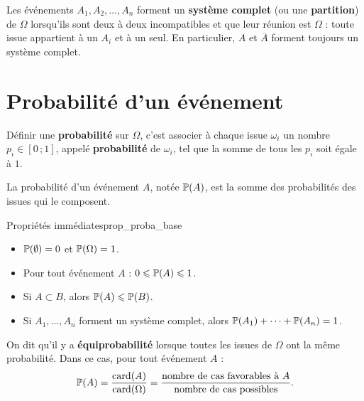 \begin{definition}
	Les événements $A_1,A_2,\ldots,A_n$ forment un \textbf{système complet}
	(ou une \textbf{partition}) de $\Omega$ lorsqu'ils sont deux à deux
	incompatibles et que leur réunion est $\Omega$ : toute issue appartient à
	un $A_i$ et à un seul. En particulier, $A$ et $\overline{A}$ forment
	toujours un système complet.
\end{definition}


\section{Probabilité d'un événement}

\begin{definition}[Probabilité]
	Définir une \textbf{probabilité} sur $\Omega$, c'est associer à chaque
	issue $\omega_i$ un nombre $p_i \in [0\,;1]$, appelé \textbf{probabilité}
	de $\omega_i$, tel que la somme de tous les $p_i$ soit égale à $1$.

	La probabilité d'un événement $A$, notée $\mathbb{P}(A)$, est la somme des
	probabilités des issues qui le composent.
\end{definition}

\begin{propriete}{Propriétés immédiates}{prop_proba_base}
	\begin{itemize}[label=\textbullet]
		\item $\mathbb{P}(\emptyset) = 0$ et $\mathbb{P}(\Omega) = 1$.
		\item Pour tout événement $A$ : $0 \leqslant \mathbb{P}(A) \leqslant 1$.
		\item Si $A\subset B$, alors $\mathbb{P}(A)\leqslant\mathbb{P}(B)$.
		\item Si $A_1,\ldots,A_n$ forment un système complet, alors
		$\mathbb{P}(A_1)+\cdots+\mathbb{P}(A_n)=1$.
	\end{itemize}
\end{propriete}

\begin{definition}
	On dit qu'il y a \textbf{équiprobabilité} lorsque toutes les issues de
	$\Omega$ ont la même probabilité. Dans ce cas, pour tout événement $A$ :
	\[
	\mathbb{P}(A) = \frac{\mathrm{card}(A)}{\mathrm{card}(\Omega)}
	= \frac{\text{nombre de cas favorables à } A}{\text{nombre de cas possibles}}.
	\]
\end{definition}

